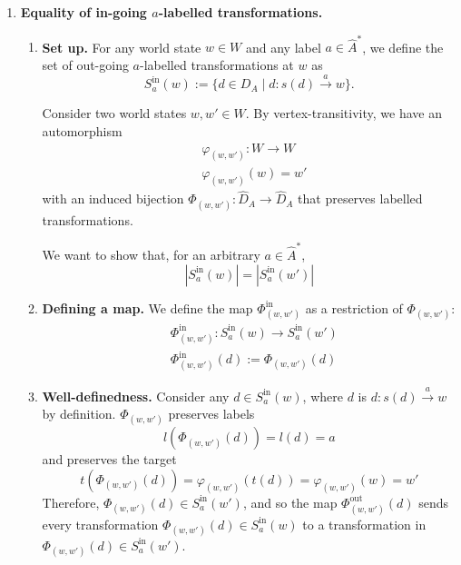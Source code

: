 \begin{proofE}
\begin{enumerate}[(1)]
    \item \textbf{Equality of in-going $a$-labelled transformations.}
    \begin{enumerate}
        \item \textbf{Set up.}
        For any world state $w \in W$ and any label $a \in \hat{A}^{*}$, we define the set of out-going $a$-labelled transformations at $w$ as
        \begin{equation}
            S_{a}^{\text{in}}(w) := \{ d \in D_{A} \mid d: s(d) \xrightarrow{a} w \}.
        \end{equation}

        Consider two world states $w, w' \in W$.
        By vertex-transitivity, we have an automorphism
        \begin{equation}
        \begin{aligned}
            & \varphi_{(w,w')}: W \to W \\
            & \varphi_{(w,w')}(w) = w'
        \end{aligned}
        \end{equation}
        with an induced bijection $\Phi_{(w, w')}: \hat{D}_{A} \to \hat{D}_{A}$ that preserves labelled transformations.

        We want to show that, for an arbitrary $a \in \hat{A}^{*}$,
        \begin{equation}
            |S_{a}^{\text{in}}(w)| = |S_{a}^{\text{in}}(w')|
        \end{equation}

        \item \textbf{Defining a map.}
        We define the map $\Phi_{(w, w')}^{\text{in}}$ as a restriction of $\Phi_{(w, w')}$:
        \begin{equation}
        \begin{aligned}
            & \Phi_{(w, w')}^{\text{in}}: S_{a}^{\text{in}}(w) \to S_{a}^{\text{in}}(w') \\
            & \Phi_{(w, w')}^{\text{in}}(d) := \Phi_{(w, w')}(d)
        \end{aligned}
        \end{equation}

        \item \textbf{Well-definedness.}
        Consider any $d \in S_{a}^{\text{in}}(w)$, where $d$ is $d: s(d) \xrightarrow{a} w$ by definition.
        $\Phi_{(w, w')}$ preserves labels
        \begin{equation}
            l(\Phi_{(w, w')}(d)) = l(d) = a
        \end{equation}
        and preserves the target
        \begin{equation}
            t(\Phi_{(w, w')}(d)) = \varphi_{(w, w')}(t(d)) = \varphi_{(w, w')}(w) = w'
        \end{equation}
        Therefore, $\Phi_{(w, w')}(d) \in S_{a}^{\text{in}}(w')$, and so the map $\Phi_{(w, w')}^{\text{out}}(d)$ sends every transformation $\Phi_{(w, w')}(d) \in S_{a}^{\text{in}}(w)$ to a transformation in $\Phi_{(w, w')}(d) \in S_{a}^{\text{in}}(w')$.


\end{enumerate}
\end{enumerate}
\end{proofE}
